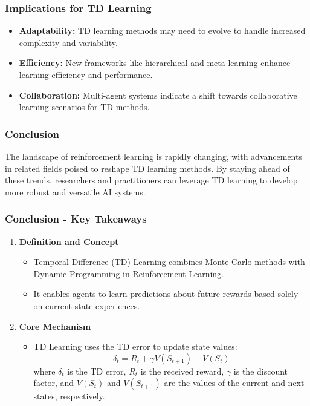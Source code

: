 \documentclass[aspectratio=169]{beamer}
\begin{document}
\begin{frame}[fragile]
    \frametitle{Implications for TD Learning}
    \begin{itemize}
        \item \textbf{Adaptability:} TD learning methods may need to evolve to handle increased complexity and variability.
        \item \textbf{Efficiency:} New frameworks like hierarchical and meta-learning enhance learning efficiency and performance.
        \item \textbf{Collaboration:} Multi-agent systems indicate a shift towards collaborative learning scenarios for TD methods.
    \end{itemize}
\end{frame}

\begin{frame}[fragile]
    \frametitle{Conclusion}
    The landscape of reinforcement learning is rapidly changing, with advancements in related fields poised to reshape TD learning methods. By staying ahead of these trends, researchers and practitioners can leverage TD learning to develop more robust and versatile AI systems.
\end{frame}

\begin{frame}[fragile]
    \frametitle{Conclusion - Key Takeaways}
    \begin{enumerate}
        \item \textbf{Definition and Concept}
        \begin{itemize}
            \item Temporal-Difference (TD) Learning combines Monte Carlo methods with Dynamic Programming in Reinforcement Learning.
            \item It enables agents to learn predictions about future rewards based solely on current state experiences.
        \end{itemize}
        
        \item \textbf{Core Mechanism}
        \begin{itemize}
            \item TD Learning uses the TD error to update state values:
            \begin{equation}
            \delta_t = R_t + \gamma V(S_{t+1}) - V(S_t)
            \end{equation}
            where \( \delta_t \) is the TD error, \( R_t \) is the received reward, \( \gamma \) is the discount factor, and \( V(S_t) \) and \( V(S_{t+1}) \) are the values of the current and next states, respectively.
        \end{itemize}
    \end{enumerate}
\end{frame}
\end{document}
